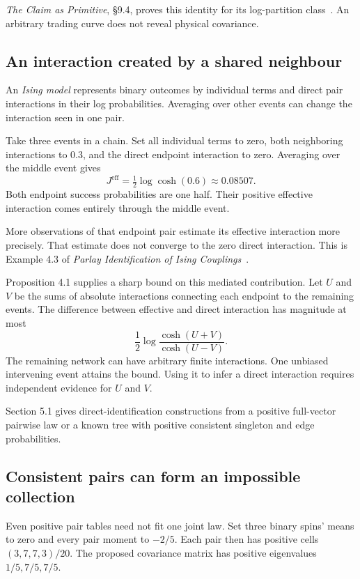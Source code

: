 \documentclass{momentum}
\begin{document}
\emph{The Claim as Primitive}, \S9.4, proves this identity for its log-partition class~\cite{claim}. An arbitrary trading curve does not reveal physical covariance.

\subsection{An interaction created by a shared neighbour}

An \emph{Ising model} represents binary outcomes by individual terms and direct pair interactions in their log probabilities. Averaging over other events can change the interaction seen in one pair.

Take three events in a chain. Set all individual terms to zero, both neighboring interactions to $0.3$, and the direct endpoint interaction to zero. Averaging over the middle event gives
\[
J^{\mathrm{eff}}=\tfrac12\log\cosh(0.6)\approx0.08507.
\]
Both endpoint success probabilities are one half. Their positive effective interaction comes entirely through the middle event.

More observations of that endpoint pair estimate its effective interaction more precisely. That estimate does not converge to the zero direct interaction. This is Example 4.3 of \emph{Parlay Identification of Ising Couplings}~\cite{parlay}.

Proposition 4.1 supplies a sharp bound on this mediated contribution. Let $U$ and $V$ be the sums of absolute interactions connecting each endpoint to the remaining events. The difference between effective and direct interaction has magnitude at most
\[
\frac12\log\frac{\cosh(U+V)}{\cosh(U-V)}.
\]
The remaining network can have arbitrary finite interactions. One unbiased intervening event attains the bound. Using it to infer a direct interaction requires independent evidence for $U$ and $V$.

Section 5.1 gives direct-identification constructions from a positive full-vector pairwise law or a known tree with positive consistent singleton and edge probabilities.

\subsection{Consistent pairs can form an impossible collection}

Even positive pair tables need not fit one joint law. Set three binary spins' means to zero and every pair moment to $-2/5$. Each pair then has positive cells $(3,7,7,3)/20$. The proposed covariance matrix has positive eigenvalues $1/5,7/5,7/5$.
\end{document}
